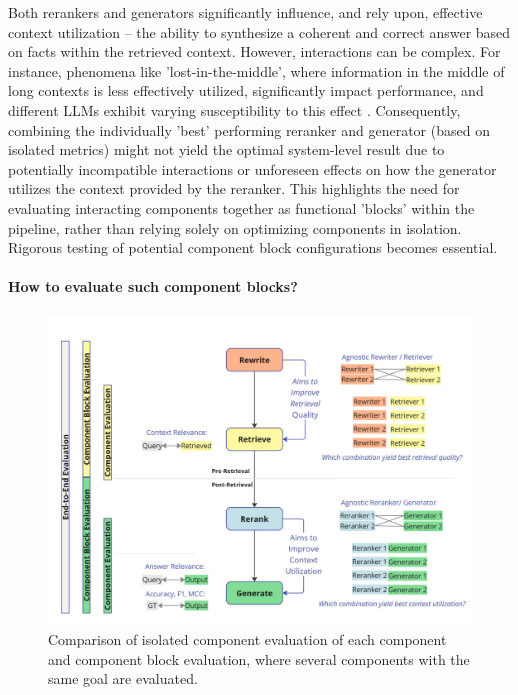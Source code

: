 Both rerankers and generators significantly influence, and rely upon, effective context utilization – the ability to synthesize a coherent and correct answer based on facts within the retrieved context. However, interactions can be complex. For instance, phenomena like 'lost-in-the-middle', where information in the middle of long contexts is less effectively utilized, significantly impact performance, and different LLMs exhibit varying susceptibility to this effect \cite{Liu.06.07.2023}. Consequently, combining the individually 'best' performing reranker and generator (based on isolated metrics) might not yield the optimal system-level result due to potentially incompatible interactions or unforeseen effects on how the generator utilizes the context provided by the reranker. This highlights the need for evaluating interacting components together as functional 'blocks' within the pipeline, rather than relying solely on optimizing components in isolation. Rigorous testing of potential component block configurations becomes essential.

\paragraph{How to evaluate such component blocks?}

\begin{figure}[!ht]
  \centering
  \includegraphics[width=\textwidth]{images/ComponentBlockEvaluation.pdf}
  \caption{Comparison of isolated component evaluation of each component and component block evaluation, where several components with the same goal are evaluated.}
  \label{fig:componentblockeval}
\end{figure}


